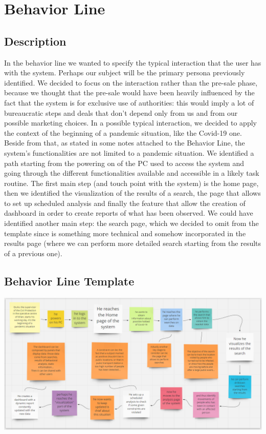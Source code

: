 \documentclass[../main.tex]{subfiles}
\begin{document}
    \chapter{Behavior Line}\label{ch:behavior-line}
    \section{Description}\label{sec:description2}
    In the behavior line we wanted to specify the typical interaction that the user has with the system. Perhaps our subject will be the primary persona previously identified. We decided to focus on the interaction rather than the pre-sale phase, because we thought that the pre-sale would have been heavily influenced by the fact that the system is for exclusive use of authorities: this would imply a lot of bureaucratic steps and deals that don’t depend only from us and from our possible marketing choices.
    In a possible typical interaction, we decided to apply the context of the beginning of a pandemic situation, like the Covid-19 one. Beside from that, as stated in some notes attached to the Behavior Line, the system’s functionalities are not limited to a pandemic situation.
    We identified a path starting from the powering on of the PC used to access the system and going through the different functionalities available and accessible in a likely task routine. The first main step (and touch point with the system) is the home page, then we identified the visualization of the results of a search, the page that allows to set up scheduled analysis and finally the feature that allow the creation of dashboard in order to create reports of what has been observed. We could have identified another main step: the search page, which we decided to omit from the template since is something more technical and somehow incorporated in the results page (where we can perform more detailed search starting from the results of a previous one).

    \section{Behavior Line Template}\label{sec:behavior-line-template}
    \includegraphics[scale = 0.55]{assets/behavior_line.png}
\end{document}

